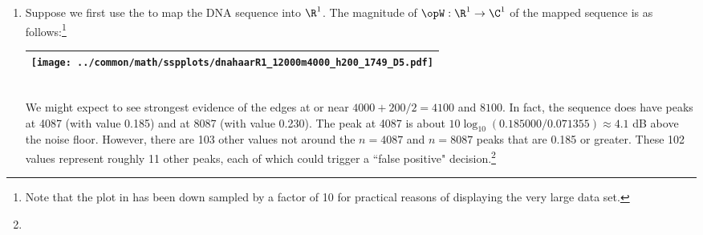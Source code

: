 \begin{example}
\begin{enumerate}
  \item \label{item:dna_haar_R1pam}
    Suppose we first use the   to map
    the DNA sequence into $\R^1$.
    The magnitude of $\opW:\R^1\to\C^1$ of the mapped sequence is as follows:\footnote{
    Note that the plot in  
    has been down sampled by a factor of 10 for practical reasons of displaying the very large data set.}
     \\\begin{tabular}{|>{\scs}c|}
          \hline
          \texttt{[image: ../common/math/sspplots/dnahaarR1\_12000m4000\_h200\_1749\_D5.pdf]}%
        \\\hline
     \end{tabular}\\
     We might expect to see strongest evidence of the edges at or near $4000+200/2=4100$ and $8100$.
     In fact, the sequence does have peaks at 4087 (with value 0.185) and at 8087 (with value 0.230).
     The peak at 4087 is about $10\log_{10}(0.185000/0.071355)\approx 4.1$ dB above the noise floor.
     However, there are 103 other values not around the $n=4087$ and $n=8087$ peaks that are 
  0.185 or greater.
  These 102 values represent roughly 11 other peaks, each of which could trigger a 
  ``false positive" decision.\footnote{}
     

\end{enumerate}
\end{example}
